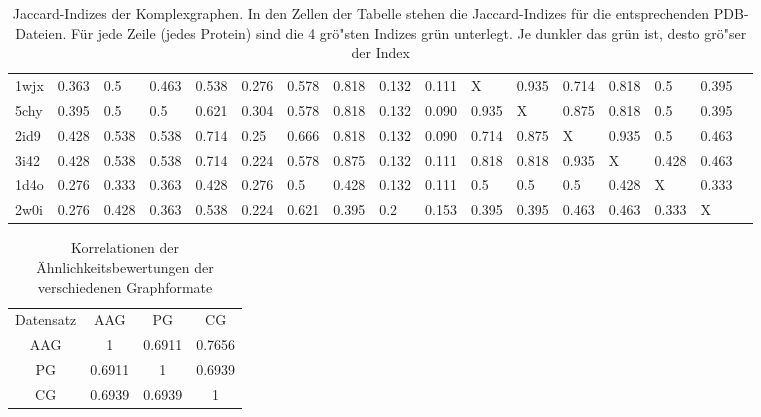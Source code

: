 \documentclass{report}
\begin{document}
\begin{table}
{\begin{tabular}{l l l l l l l l l l l l l l l l l}
1wjx & 0.363 & 0.5 & 0.463 & 0.538 & 0.276 & 0.578 & \cellcolor{fGreen!50}0.818 & 0.132 & 0.111 &   X   & \cellcolor{fGreen!100}0.935 & \cellcolor{fGreen!25}0.714 & \cellcolor{fGreen!75}0.818 & 0.5 & 0.395 &  \\
5chy & 0.395 & 0.5 & 0.5 & 0.621 & 0.304 & 0.578 & \cellcolor{fGreen!25}0.818 & 0.132 & 0.090 & \cellcolor{fGreen!100}0.935 &   X   & \cellcolor{fGreen!75}0.875 & \cellcolor{fGreen!50}0.818 & 0.5 & 0.395 &  \\
2id9 & 0.428 & 0.538 & 0.538 & 0.714 & 0.25 & 0.666 & \cellcolor{fGreen!50}0.818 & 0.132 & 0.090 & \cellcolor{fGreen!25}0.714 & \cellcolor{fGreen!75}0.875 &   X   & \cellcolor{fGreen!100}0.935 & 0.5 & 0.463 &  \\
3i42 & 0.428 & 0.538 & 0.538 & 0.714 & 0.224 & 0.578 & \cellcolor{fGreen!75}0.875 & 0.132 & 0.111 & \cellcolor{fGreen!25}0.818 & \cellcolor{fGreen!50}0.818 & \cellcolor{fGreen!100}0.935 &   X   & 0.428 & 0.463 &  \\
1d4o & 0.276 & 0.333 & 0.363 & 0.428 & 0.276 & \cellcolor{fGreen!100}0.5 & 0.428 & 0.132 & 0.111 & \cellcolor{fGreen!50}0.5 & \cellcolor{fGreen!25}0.5 & \cellcolor{fGreen!75}0.5 & 0.428 &   X   & 0.333 &  \\
2w0i & 0.276 & 0.428 & 0.363 & \cellcolor{fGreen!75}0.538 & 0.224 & \cellcolor{fGreen!100}0.621 & 0.395 & 0.2 & 0.153 & 0.395 & 0.395 & \cellcolor{fGreen!25}0.463 & \cellcolor{fGreen!50}0.463 & 0.333 &   X   &  \\

\end{tabular}}
\caption{Jaccard-Indizes der Komplexgraphen. In den Zellen der Tabelle stehen die Jaccard-Indizes f\"ur die entsprechenden PDB-Dateien. F\"ur jede Zeile (jedes Protein) sind die 4 gr\"o"sten Indizes gr\"un unterlegt. Je dunkler das gr\"un ist, desto gr\"o"ser der Index}
\end{table}


\begin{table}
\label{tab:correlations}
\begin{tabular}{c c c c}
Datensatz & AAG     &     PG &     CG \\
AAG       &  1      & 0.6911 & 0.7656 \\
PG        &  0.6911 &      1 & 0.6939 \\
CG        &  0.6939 & 0.6939 & 1      \\

\end{tabular}
\caption{Korrelationen der \"Ahnlichkeitsbewertungen der verschiedenen Graphformate}
\end{table}






\end{document}
